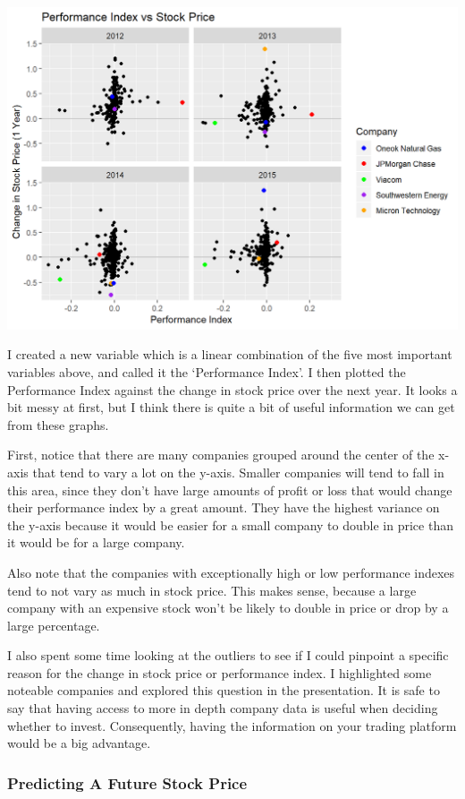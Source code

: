 \documentclass[]{article}
\begin{document}
\includegraphics{performance.png}

I created a new variable which is a linear combination of the five most
important variables above, and called it the `Performance Index'. I then
plotted the Performance Index against the change in stock price over the
next year. It looks a bit messy at first, but I think there is quite a
bit of useful information we can get from these graphs.

First, notice that there are many companies grouped around the center of
the x-axis that tend to vary a lot on the y-axis. Smaller companies will
tend to fall in this area, since they don't have large amounts of profit
or loss that would change their performance index by a great amount.
They have the highest variance on the y-axis because it would be easier
for a small company to double in price than it would be for a large
company.

Also note that the companies with exceptionally high or low performance
indexes tend to not vary as much in stock price. This makes sense,
because a large company with an expensive stock won't be likely to
double in price or drop by a large percentage.

I also spent some time looking at the outliers to see if I could
pinpoint a specific reason for the change in stock price or performance
index. I highlighted some noteable companies and explored this question
in the presentation. It is safe to say that having access to more in
depth company data is useful when deciding whether to invest.
Consequently, having the information on your trading platform would be a
big advantage.

\hypertarget{predicting-a-future-stock-price}{%
\subsubsection{Predicting A Future Stock
Price}\label{predicting-a-future-stock-price}}
\end{document}

